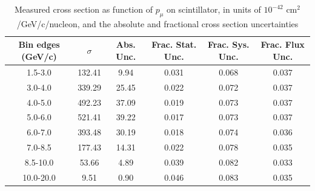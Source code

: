 \documentclass[../main.tex]{subfiles}
\begin{document}
\setlength\tabcolsep{0.5em}
\begin{table}
  \centering
  \renewcommand{\arraystretch}{1.15}
  \caption{Measured cross section as function of $p_{\mu}$ on scintillator, in units of $10^{-42}$ $\text{cm}^2$/GeV/c/nucleon, and the absolute and fractional cross section uncertainties}
    \begin{tabular}{c||c|c||c|c|c}
      Bin edges (GeV/c) &  $\sigma$  &  Abs. Unc.  &  Frac. Stat. Unc.  &  Frac. Sys. Unc.  &  Frac. Flux Unc. \\
      \hline
      \hline
      1.5-3.0 & 132.41 & 9.94 & 0.031 & 0.068 & 0.037\\
      3.0-4.0 & 339.29 & 25.45 & 0.022 & 0.072 & 0.037\\
      4.0-5.0 & 492.23 & 37.09 & 0.019 & 0.073 & 0.037\\
      5.0-6.0 & 521.41 & 39.22 & 0.017 & 0.073 & 0.037\\
      6.0-7.0 & 393.48 & 30.19 & 0.018 & 0.074 & 0.036\\
      7.0-8.5 & 177.43 & 14.31 & 0.022 & 0.078 & 0.035\\
      8.5-10.0 & 53.66 & 4.89 & 0.039 & 0.082 & 0.033\\
      10.0-20.0 & 9.51 & 0.90 & 0.046 & 0.083 & 0.035
    \end{tabular}
  \label{tbl:datanucleonplasticmuon_pa}
\end{table}
\begin{table}
  \centering
  \renewcommand{\arraystretch}{1.15}
  \caption{Statistical covariance matrix of measured cross section as function of $p_{\mu}$ on scintillator, in units of $10^{-84}$ $(\text{cm}^2$/GeV/c/nucleon$)^2$}
  \label{tbl:statnucleonplasticmuon_pb}
\end{table}
\end{document}
